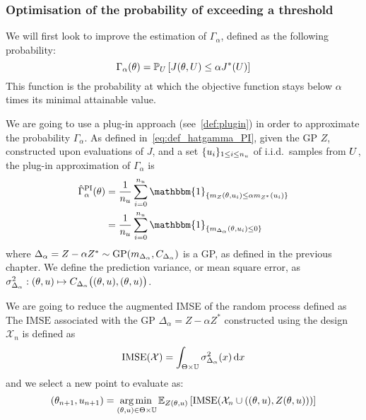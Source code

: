 \documentclass[../../Main_ManuscritThese.tex]{subfiles}
\begin{document}
\subsubsection{Optimisation of the probability of exceeding a threshold}

We will first look to improve the estimation of $\Gamma_{\alpha}$,
defined as the following probability:
\begin{equation}
  \Gamma_{\alpha}(\theta) = \mathbb{P}_{U}\left[J(\theta,U) \leq \alpha J^*(U)\right]
\end{equation}
This function is the probability at which the objective function stays
below $\alpha$ times its minimal attainable value.

We are going to use a plug-in approach (see~\cref{def:plugin}) in
order to approximate the probability $\Gamma_{\alpha}$. As defined
in~\cref{eq:def_hatgamma_PI}, given the GP $Z$, constructed upon
evaluations of $J$, and a set $\{u_i\}_{1\leq i\leq n_{u}}$ of
i.i.d.\ samples from $U$, the plug-in approximation of
$\Gamma_{\alpha}$ is
\begin{align}
  \hat{\Gamma}^{\mathrm{PI}}_{\alpha}(\kk) &= \frac{1}{n_\uu}\sum_{i=0}^{n_{\uu}} \mathbbm{1}_{\{m_Z(\kk, \uu_i) \leq \alpha m_{Z^*}(\uu_i)\}} \\
                                           &= \frac{1}{n_\uu}\sum_{i=0}^{n_{\uu}} \mathbbm{1}_{\{m_{\Delta_{\alpha}}(\kk,\uu_i) \leq 0\}}
\end{align}
where
$\Delta_{\alpha} = Z - \alpha Z^* \sim \operatorname{\mathrm{GP}}(m_{\Delta_{\alpha}},
C_{\Delta_\alpha})$ is a GP, as defined in the previous chapter. We
define the prediction variance, or mean square error, as
$\sigma^2_{\Delta_{\alpha}}: (\theta, u) \mapsto
C_{\Delta_{\alpha}}\big((\theta, u), (\theta, u) \big)$.

We are going to reduce the augmented IMSE of the random process
defined as The $\mathrm{IMSE}$ associated with the GP
$\Delta_{\alpha}=Z-\alpha Z^*$ constructed using the design
$\mathcal{X}_n$ is defined as
\begin{equation}
  \operatorname{\mathrm{IMSE}}(\mathcal{X}) = \int_{\Theta \times \mathbb{U}} \sigma^2_{\Delta_{\alpha}}(x) \,\mathrm{d}x
\end{equation}
and we select a new point to evaluate as:
\begin{equation}
  (\theta_{n+1}, u_{n+1}) = \operatorname*{arg\,min \,}_{(\theta,u)\in\Theta\times \mathbb{U}} \mathbb{E}_{Z(\theta, u)}\left[\operatorname{\mathrm{IMSE}}(\mathcal{X}_n \cup \left((\theta, u), Z(\theta, u)\right))\right]
\end{equation}
\end{document}
